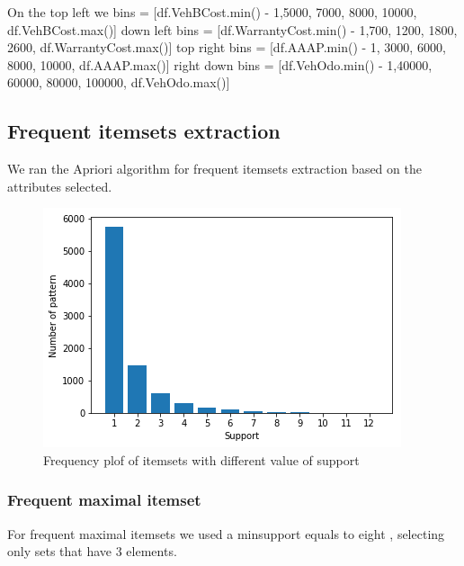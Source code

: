 \documentclass{article}
\begin{document}
	On the top left we bins = [df.VehBCost.min() - 1,5000, 7000, 8000, 10000, df.VehBCost.max()]
	down left bins = [df.WarrantyCost.min() - 1,700, 1200, 1800, 2600, df.WarrantyCost.max()]
	top right bins = [df.AAAP.min() - 1, 3000, 6000, 8000, 10000, df.AAAP.max()]
	right down bins = [df.VehOdo.min() - 1,40000, 60000, 80000, 100000, df.VehOdo.max()]
	
	\subsection{Frequent itemsets extraction}
	
	We ran the Apriori algorithm for frequent itemsets extraction based on the attributes selected. 
	
	\begin{figure}[H]
		\centering
		\includegraphics[width=.49\textwidth]{support.png}
		\caption{Frequency plof of itemsets with different value of support}
		\label{fig:hyper_rf_us}
	\end{figure}
	
	\subsubsection{Frequent maximal itemset}
	For frequent  maximal itemsets we used a minsupport equals to eight , selecting only sets that have 3 elements.
	
\end{document}
